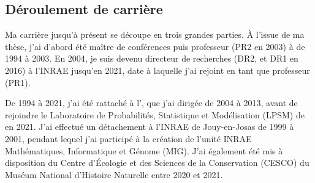 
\subsection*{Déroulement de carrière}


Ma carrière jusqu'à présent se découpe en trois grandes parties. À l'issue de ma thèse, j'ai d'abord été maître de conférences puis professeur (PR2 en 2003) à \APT de 1994 à 2003. En 2004, je suis devenu directeur de recherches (DR2, et DR1 en 2016) à l'INRAE jusqu'en 2021, date à laquelle j'ai rejoint \SU en tant que professeur (PR1). 

De 1994 à 2021, j'ai été rattaché à l'\UMRlong, que j'ai dirigée de 2004 à 2013, avant de rejoindre le Laboratoire de Probabilités, Statistique et Modélisation (LPSM) de \SU en 2021. 
J'ai effectué un détachement à l'INRAE de Jouy-en-Josas de 1999 à 2001, pendant lequel j'ai participé à la création de l'unité INRAE Mathématiques, Informatique et Génome (MIG). 
J'ai également été mis à disposition du Centre d'Écologie et des Sciences de la Conservation (CESCO) du Muséum National d'Histoire Naturelle entre 2020 et 2021.

